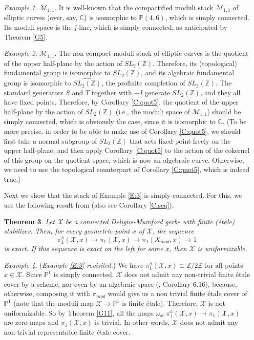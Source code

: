 \documentclass{amsart}
\newtheorem{thm}{Theorem}[section]
\theoremstyle{definition}
\theoremstyle{remark}
\theoremstyle{remark}
\newtheorem{ex}[thm]{Example}
\newcommand{\X}{\mathcal{X}}
\newcommand{\Xm}{X_{mod}}
\newcommand{\pim}{\pi_{mod}}
\newcommand{\pX}{\pi_1(\X,x)}
\newcommand{\phX}{\pi_1^{h}(\X,x)}
\newcommand{\pXm}{\pi_1(\Xm,x)}
\let\:=\colon
\begin{document}
\begin{ex}{$\bar{\mathcal{M}}_{1,1}$.}
It is well-known that the compactified moduli stack
$\bar{\mathcal{M}}_{1,1}$ of elliptic curves (over, say,
$\mathbb{C}$) is isomorphic to $\mathbb{P}(4,6)$, which is simply
connected. Its moduli space is the $j$-line, which is simply
connected, as anticipated by Theorem \ref{G5}.
\end{ex}

\begin{ex}{$\mathcal{M}_{1,1}$.}
The non-compact moduli stack of elliptic curves is the quotient of
the upper half-plane by the action of $SL_2(\mathbb{Z})$.
Therefore, its (topological) fundamental group is isomorphic to
$SL_2(\mathbb{Z})$, and its algebraic fundamental group is
isomorphic to $\widehat{SL_2(\mathbb{Z})}$, the profinite
completion of $SL_2(\mathbb{Z})$. The standard generators $S$ and
$T$ together with $-I$ generate $SL_2(\mathbb{Z})$, and they all
have fixed points. Therefore, by Corollary \ref{C:quot5}, the
quotient of the upper half-plane by the action of
$SL_2(\mathbb{Z})$ (i.e., the moduli space of $\mathcal{M}_{1,1}$)
should be simply connected, which is obviously the case, since it
is isomorphic to $\mathbb{C}$. (To be more precise, in order to be
able to  make use of Corollary \ref{C:quot5}, we should first take
a normal subgroup of $SL_2(\mathbb{Z})$ that acts
fixed-point-freely on the upper half-plane, and then apply
Corollary \ref{C:quot5} to the action of the cokernel of this
group on the quotient space, which is now an algebraic curve.
Otherwise, we need to use the topological counterpart of Corollary
\ref{C:quot5}, which is indeed true.)
\end{ex}

Next we show that the stack of Example \ref{E:3} is
simply-connected. For this, we use the following result from
\cite{Noohi} (also see Corollary \ref{C:seq}).

\begin{thm}{\label{G11}}
Let $\X$ be a connected Deligne-Mumford gerbe with finite
(\'{e}tale) stabilizer. Then, for every geometric point $x$ of
$\X$, the sequence $$\pi_1^{h}(\X,x) \to \pX \to \pXm \to 1  $$
\noindent is exact. If this sequence is exact on the left for some
$x$, then $\X$ is uniformizable.
\end{thm}

\begin{ex}({\em Example \ref{E:3} revisited.})
We have $\phX \cong \mathbb{Z}/2\mathbb{Z}$ for all points $x \in
\X$. Since  $\mathbb{P}^1$ is simply connected, $\X$ does not
admit any  non-trivial finite \'{e}tale cover by a scheme, nor
even by an algebraic space (\cite{Kn}, Corollary 6.16), because,
otherwise, composing it with $\pim$ would give us a non trivial
finite \'{e}tale cover of $\mathbb{P}^1$ (note that the moduli map
$\X \to \mathbb{P}^1$ is finite \'{e}tale). Therefore, $\X$ is not
uniformizable. So by Theorem \ref{G11}, all the maps $\omega_x \:
\phX \to \pX$ are zero maps and $\pX$ is trivial. In other words,
$\X$ does not admit any non-trivial representable finite \'{e}tale
cover.
\end{ex}
\end{document}
